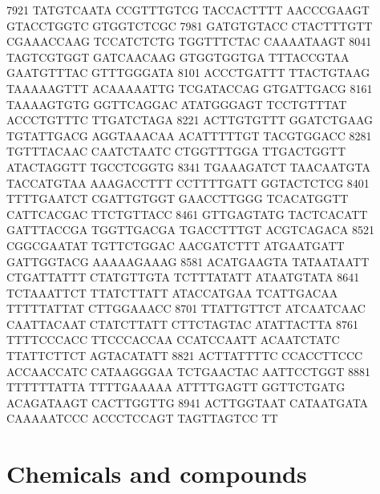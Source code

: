 \begin{addmargin}{0.1\textwidth}
\begin{footnotesize}
\begin{LVerbatim}[commandchars=\\\{\}]
\color{red}7921 TATGTCAATA CCGTTTGTCG TACCACTTTT AACCCGAAGT GTACCTGGTC GTGGTCTCGC 
\color{red}7981 GATGTGTACC CTACTTTGTT CGAAACCAAG TCCATCTCTG TGGTTTCTAC CAAAATAAGT 
\color{red}8041 TAGTCGTGGT GATCAACAAG GTGGTGGTGA TTTACCGTAA GAATGTTTAC GTTTGGGATA 
\color{red}8101 ACCCTGATTT TTACTGTAAG TAAAAAGTTT ACAAAAATTG TCGATACCAG GTGATTGACG 
\color{red}8161 TAAAAGTGTG GGTTCAGGAC ATATGGGAGT TCCTGTTTAT ACCCTGTTTC TTGATCTAGA 
\color{red}8221 ACTTGTGTTT GGATCTGAAG TGTATTGACG AGGTAAACAA ACATTTTTGT TACGTGGACC 
\color{red}8281 TGTTTACAAC CAATCTAATC CTGGTTTGGA TTGACTGGTT ATACTAGGTT TGCCTCGGTG 
\color{red}8341 TGAAAGATCT TAACAATGTA TACCATGTAA AAAGACCTTT CCTTTTGATT GGTACTCTCG 
\color{red}8401 TTTTGAATCT CGATTGTGGT GAACCTTGGG TCACATGGTT CATTCACGAC TTCTGTTACC 
\color{red}8461 GTTGAGTATG TACTCACATT GATTTACCGA TGGTTGACGA TGACCTTTGT ACGTCAGACA 
\color{red}8521 CGGCGAATAT TGTTCTGGAC AACGATCTTT ATGAATGATT GATTGGTACG AAAAAGAAAG 
\color{red}8581 ACATGAAGTA TATAATAATT CTGATTATTT CTATGTTGTA TCTTTATATT ATAATGTATA 
\color{red}8641 TCTAAATTCT TTATCTTATT ATACCATGAA TCATTGACAA TTTTTATTAT CTTGGAAACC 
\color{red}8701 TTATTGTTCT ATCAATCAAC CAATTACAAT CTATCTTATT CTTCTAGTAC ATATTACTTA 
\color{red}8761 TTTTCCCACC TTCCCACCAA CCATCCAATT ACAATCTATC TTATTCTTCT AGTACATATT 
\color{red}8821 ACTTATTTTC CCACCTTCCC ACCAACCATC CATAAGGGAA TCTGAACTAC AATTCCTGGT 
\color{red}8881 TTTTTTATTA TTTTGAAAAA ATTTTGAGTT GGTTCTGATG ACAGATAAGT CACTTGGTTG 
\color{red}8941 ACTTGGTAAT CATAATGATA CAAAAATCCC ACCCT\color{black}CCAGT TAGTTAGTCC TT
\end{LVerbatim}
\end{footnotesize}

\end{addmargin}






\section{Chemicals and compounds}

